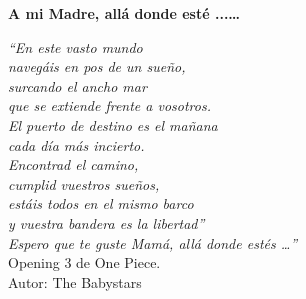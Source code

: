 % 
% 
% 
% 
% 
% 
% 
% 

% 
% 

\thispagestyle{empty}

\begin{flushright}

  \vspace*{\fill}

  \textbf{A mi Madre, allá donde esté ...\ldots}\\

  \vspace{3cm}

  \emph{``En este vasto mundo \\
  	navegáis en pos de un sueño,  \\
  	surcando el ancho mar  \\
  	que se extiende frente a vosotros.  \\
  	El puerto de destino es el mañana  \\
  	cada día más incierto.  \\
  	Encontrad el camino,  \\
  	cumplid vuestros sueños,  \\
  	estáis todos en el mismo barco  \\
  	y vuestra bandera es la libertad”  \\
  	Espero que te guste Mamá, allá donde estés …''}\\ 
    Opening 3 de One Piece. \\
    Autor: The Babystars

\end{flushright}  

\vspace{4cm}
\vspace*{\fill}




